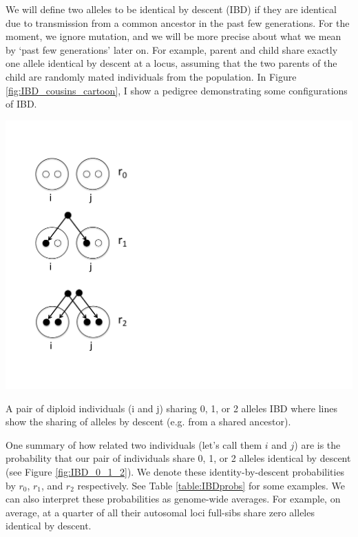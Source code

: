 {{We will define two alleles to be identical by descent (IBD) if they are
identical due to transmission from a common ancestor in the past few generations\cite{cotterman:40,malecot:48}. For the moment,
we ignore mutation, and we will be more precise about what we mean by `past few
generations' later on. For example, parent and child share exactly one allele
identical by descent at a locus, assuming that the two parents of the child are
randomly mated individuals from the population. In Figure
\ref{fig:IBD_cousins_cartoon}, I show a pedigree demonstrating some
configurations of IBD. \\
\begin{marginfigure}[0cm]
\begin{center}
\includegraphics[width= 0.75 \textwidth]{figures/sharing_relatives/IBD_0_1_2.pdf}
\end{center}
\caption{A pair of diploid individuals (i and j) sharing 0, 1, or 2 alleles IBD
  where lines show the sharing of alleles by descent (e.g. from a
  shared ancestor). } \label{fig:IBD_0_1_2}
\end{marginfigure}
One summary of how related two individuals (let's call them $i$ and $j$) are is the probability that our pair
of individuals share 0, 1, or 2 alleles identical by descent (see Figure
\ref{fig:IBD_0_1_2}). We denote these  identity-by-descent probabilities by $r_0$, $r_1$, and $r_2$
respectively. See Table \ref{table:IBDprobs} for some examples. We can also
interpret these probabilities as genome-wide averages. For example, on average, at a quarter of all their autosomal loci
full-sibs share zero alleles identical by descent.\\



}}
